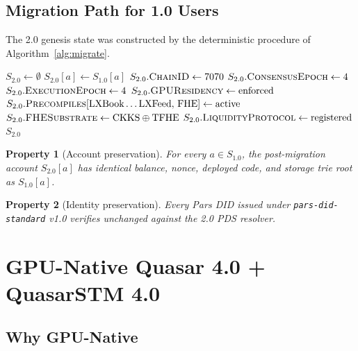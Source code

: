 \documentclass[11pt,a4paper]{article}
\newtheorem{property}{Property}[section]
\begin{document}
\subsection{Migration Path for 1.0 Users}

The 2.0 genesis state was constructed by the deterministic procedure of
Algorithm~\ref{alg:migrate}.

\begin{algorithm}[H]
\caption{Pars 1.0 $\to$ 2.0 state migration, applied at $h_0$}
\label{alg:migrate}
\begin{algorithmic}[1]
  \State $S_{2.0} \gets \emptyset$
    \State $S_{2.0}[a] \gets S_{1.0}[a]$ 
  \EndFor
  \State $S_{2.0}.\textsc{ChainID} \gets 7070$ 
  \State $S_{2.0}.\textsc{ConsensusEpoch} \gets 4$
  \State $S_{2.0}.\textsc{ExecutionEpoch} \gets 4$
  \State $S_{2.0}.\textsc{GPUResidency} \gets \mathrm{enforced}$
  \State $S_{2.0}.\textsc{Precompiles}[\text{LXBook}\dots\text{LXFeed},\,\text{FHE}] \gets \mathrm{active}$
  \State $S_{2.0}.\textsc{FHESubstrate} \gets \mathrm{CKKS} \oplus \mathrm{TFHE}$
  \State $S_{2.0}.\textsc{LiquidityProtocol} \gets \mathrm{registered}$ 
  \State \Return $S_{2.0}$
\EndProcedure
\end{algorithmic}
\end{algorithm}

\begin{property}[Account preservation]
For every $a \in S_{1.0}$, the post-migration account
$S_{2.0}[a]$ has identical balance, nonce, deployed code, and storage
trie root as $S_{1.0}[a]$.
\end{property}

\begin{property}[Identity preservation]
Every Pars DID issued under \texttt{pars-did-standard} v1.0 verifies
unchanged against the 2.0 PDS resolver.
\end{property}

\section{GPU-Native Quasar 4.0 + QuasarSTM 4.0}
\label{sec:gpu}

\subsection{Why GPU-Native}
\end{document}
